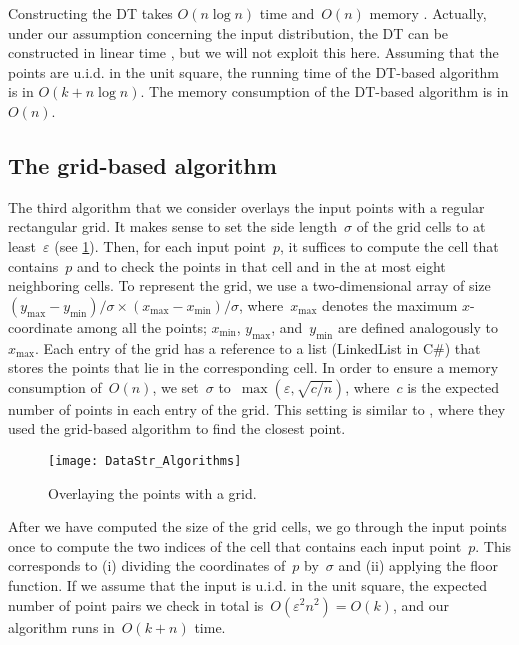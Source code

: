 Constructing the DT takes $O(n\log n)$ time 
and~$O(n)$ memory \parencite{Leach1992Delaunay}. 
Actually, under our assumption concerning the input 
distribution, the DT can be constructed in linear time
\parencite{Buchin2009_Delaunay}, 
but we will not exploit this here. 
Assuming that the points are u.i.d. in the unit square, 
the running time of the DT-based algorithm 
is in $O(k+n\log n)$. 
The memory consumption of the DT-based algorithm is in $O(n)$.


\subsection{The grid-based algorithm}
\label{sec:DataStr_GridAlgorithm}

The third algorithm that 
we consider overlays the input points with a 
regular rectangular grid. 
It makes sense to set the side length~$\sigma$ of the grid cells 
to at least~$\varepsilon$
(see \fig\ref{fig:DataStr_Grid}). 
Then, for each input point~$p$, 
it suffices to compute the cell that contains~$p$ and 
to check the points 
in that cell and in the at most eight neighboring cells. 
To represent the grid, 
we use a two-dimensional array of 
size~$(y_\mathrm{max}-y_\mathrm{min})/\sigma \times 
(x_\mathrm{max}-x_\mathrm{min})/\sigma $, 
where~$x_\mathrm{max}$ denotes the maximum $x$-coordinate 
among all the points; 
$x_\mathrm{min}$, $y_\mathrm{max}$, and~$y_\mathrm{min}$ are 
defined analogously to~$x_\mathrm{max}$. 
Each entry of the grid has a reference 
to a list (LinkedList in C\#) 
that stores the points that lie in the corresponding cell. 
In order to ensure a memory consumption of~$O(n)$, 
we set~$\sigma$ to~$\max (\varepsilon ,\sqrt{c/n})$, 
where~$c$ is the expected number of points 
in each entry of the grid.
This setting is similar to \textcite{Bentley1980Closest}, 
where they used the grid-based algorithm to find the closest 
point.

\begin{figure}[tb]
	\centering
	\texttt{[image: DataStr\_Algorithms]}
	\caption{Overlaying the points with a grid.}
	\label{fig:DataStr_Grid}
\end{figure}

After we have computed the size of the grid cells, 
we go through the input points once 
to compute the two indices of the cell 
that contains each input point~$p$. 
This corresponds to 
(i) dividing the coordinates of~$p$ by~$\sigma$ and 
(ii) applying the floor function. 
If we assume that the input is u.i.d. in the unit square, 
the expected number of point pairs 
we check in total is~$O(\varepsilon ^{2}n^{2})=O(k)$, 
and our algorithm runs in~$O(k+n)$ time.





